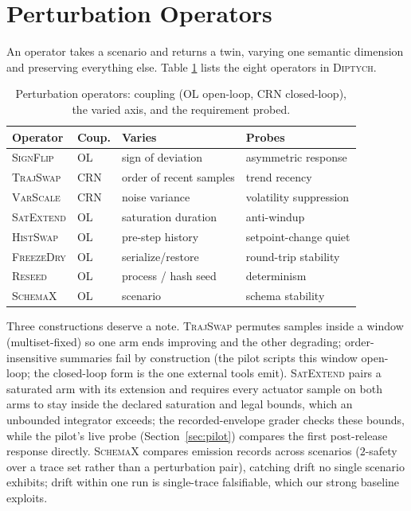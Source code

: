 \documentclass[sigconf,review,anonymous]{acmart}
\newcommand{\sys}{\textsc{Diptych}}
\begin{document}
	\section{Perturbation Operators}
	\label{sec:operators}
	
	An operator takes a scenario and returns a twin, varying one semantic
	dimension and preserving everything else. Table \ref{tab:ops} lists the
	eight operators in \sys{}.
	
	\begin{table}[t]
		\caption{Perturbation operators: coupling (OL open-loop, CRN
			closed-loop), the varied axis, and the requirement probed.}
		\label{tab:ops}
		\centering
		\scriptsize
		\begin{tabular}{@{}llll@{}}
			\toprule
			Operator & Coup. & Varies & Probes \\
			\midrule
			\textsc{SignFlip}  & OL  & sign of deviation & asymmetric response \\
			\textsc{TrajSwap}  & CRN & order of recent samples & trend recency \\
			\textsc{VarScale}  & CRN & noise variance & volatility suppression \\
			\textsc{SatExtend} & OL  & saturation duration & anti-windup \\
			\textsc{HistSwap}  & OL  & pre-step history & setpoint-change quiet \\
			\textsc{FreezeDry} & OL  & serialize/restore & round-trip stability \\
			\textsc{Reseed}    & OL  & process / hash seed & determinism \\
			\textsc{SchemaX}   & OL  & scenario & schema stability \\
			\bottomrule
		\end{tabular}
	\end{table}
	
	Three constructions deserve a note.
	\textsc{TrajSwap} permutes samples inside a window (multiset-fixed) so one arm
	ends improving and the other degrading; order-insensitive summaries fail by
	construction (the pilot scripts this window open-loop; the closed-loop
	form is the one external tools emit). \textsc{SatExtend} pairs a saturated arm with its
	extension and requires every actuator sample on both arms to stay inside
	the declared saturation and legal bounds, which an unbounded integrator
	exceeds; the recorded-envelope grader checks
	these bounds, while the pilot's live probe (Section~\ref{sec:pilot})
	compares the first post-release response directly.
	\textsc{SchemaX} compares emission records across scenarios ($2$-safety
	over a trace set rather than a perturbation pair), catching drift no
	single scenario exhibits; drift within one run is single-trace
	falsifiable, which our strong baseline exploits.
	
\end{document}
